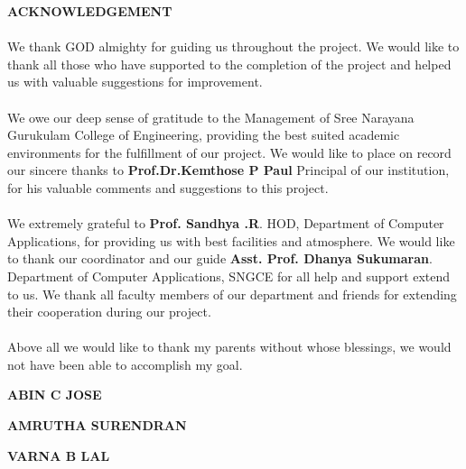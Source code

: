 \documentclass[a4paper, 12pt]{report}
\begin{document}

\begin{titlepage}
   {\fontsize{16pt}{16pt}\selectfont\bfseries\center ACKNOWLEDGEMENT \par}
	\paragraph{}  {\fontsize{14pt}{14pt}\selectfont
We thank GOD almighty for guiding us throughout the project. We would like to thank all those who have supported to the completion of the project and helped us with valuable suggestions for improvement.
\paragraph{}
We owe our deep sense of gratitude to the Management of Sree Narayana Gurukulam College of Engineering, providing the best suited academic environments for the fulfillment of our project. We would like to place on record our sincere thanks to \textbf{Prof.Dr.Kemthose P Paul} Principal of our institution, for his valuable comments and suggestions to this project.
\paragraph{}
 We extremely grateful to {\bfseries Prof. Sandhya .R}. HOD, Department of Computer Applications, for providing us with best facilities and atmosphere. We would like to thank our coordinator and our guide        {\bfseries  Asst. Prof. Dhanya Sukumaran}. Department of Computer Applications, SNGCE for all help and support extend to us. We thank all faculty members of our department and friends for extending their cooperation during our project.
\paragraph{}
Above all we would like to thank my parents without whose blessings, we would not have been able to accomplish my goal.\\ \vspace{1cm}
	
	{\bfseries\hspace{275pt}ABIN C JOSE \par}
	{\bfseries\hspace{275pt}AMRUTHA SURENDRAN \par}
	{\bfseries\hspace{270pt} VARNA B LAL\par}
	}
\end{titlepage}
\end{document}
